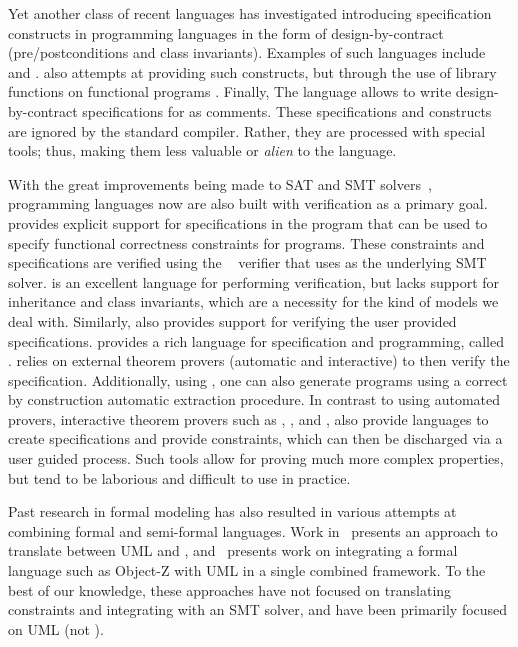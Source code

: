Yet another class of recent languages has investigated introducing
specification constructs in programming languages in the form of
design-by-contract (pre/postconditions and class invariants). Examples
of such languages include \eiffel{} \cite{meyer1988eiffel} and
\specsharp{} \cite{barnett2011specification}.  \scala{} also attempts
at providing such constructs, but through the use of library functions
on functional programs \cite{odersky-rv10}. Finally, The \jml{}
language \cite{leavens1998jml} allows to write design-by-contract
specifications for \java{} as comments. These specifications and
constructs are ignored by the standard \java{} compiler. Rather, they
are processed with special tools; thus, making them less valuable or
{\em alien} to the language.

With the great improvements being made to SAT and SMT
solvers~\cite{smt-lib,de2008z3}, programming languages now are also
built with verification as a primary goal. \dafny{}
\cite{leino-lpar-2010} provides explicit support for specifications in
the program that can be used to specify functional correctness
constraints for programs. These constraints and specifications are
verified using the \boogie{}~\cite{barnett2006boogie} verifier that
uses \zthree{} as the underlying SMT solver. \dafny{} is an excellent
language for performing verification, but lacks support for
inheritance and class invariants, which are a necessity for the kind
of models we deal with. Similarly, \specsharp{} also provides support
for verifying the user provided specifications. \whythree{}
\cite{filliatre-why3-2011} provides a rich language for specification
and programming, called \whyml{}. \whythree{} relies on external
theorem provers (automatic and interactive) to then verify the
specification. Additionally, using \whyml{}, one can also generate
\ocaml{} programs using a correct by construction automatic extraction
procedure. In contrast to using automated provers, interactive theorem
provers such as \pvs{} \cite{cade92-pvs,pvs-website}, \coq{}
\cite{barras1997coq}, and \isabelle{} \cite{nipkow2002isabelle}, also
provide languages to create specifications and provide constraints,
which can then be discharged via a user guided process. Such tools
allow for proving much more complex properties, but tend to be
laborious and difficult to use in practice.

Past research in formal modeling has also resulted in various attempts
at combining formal and semi-formal languages. Work
in~\cite{lausdahl2009connecting} presents an approach to translate
between UML and \vdmpp{}, and~\cite{kim2005mda} presents work on
integrating a formal language such as Object-Z with UML in a single
combined framework. To the best of our knowledge, these approaches
have not focused on translating constraints and integrating with an
SMT solver, and have been primarily focused on UML (not \sysml).


